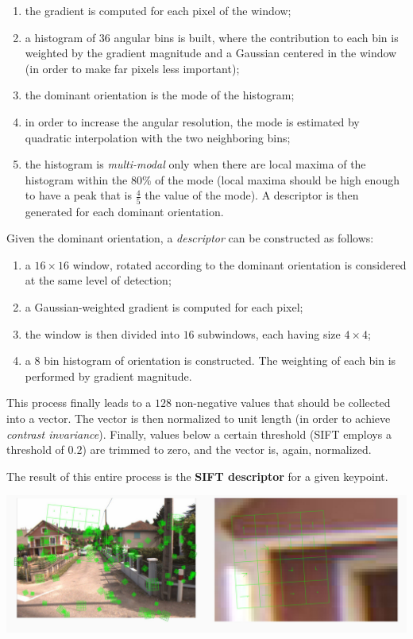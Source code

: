 \documentclass[10pt]{report}
\begin{document}
\begin{enumerate}
\item the gradient is computed for each pixel of the window;
\item a histogram of \(36\) angular bins is built, where the contribution
to each bin is weighted by the gradient magnitude and a Gaussian
centered in the window (in order to make far pixels less important);
\item the dominant orientation is the mode of the histogram;
\item in order to increase the angular resolution, the mode is estimated by
quadratic interpolation with the two neighboring bins;
\item the histogram is \emph{multi-modal} only when there are local maxima of
the histogram within the \(80\%\) of the mode (local maxima should be
high enough to have a peak that is \(\frac{4}{5}\) the value of the
mode). A descriptor is then generated for each dominant orientation.
\end{enumerate}

Given the dominant orientation, a \emph{descriptor} can be constructed as
follows:

\begin{enumerate}
\item a \(16 \times 16\) window, rotated according to the dominant
orientation is considered at the same level of detection;
\item a Gaussian-weighted gradient is computed for each pixel;
\item the window is then divided into \(16\) subwindows, each having size
\(4\times 4\);
\item a \(8\) bin histogram of orientation is constructed. The weighting of
each bin is performed by gradient magnitude.
\end{enumerate}

This process finally leads to a \(128\) non-negative values that should
be collected into a vector. The vector is then normalized to unit length
(in order to achieve \emph{contrast invariance}). Finally, values below a
certain threshold (SIFT employs a threshold of \(0.2\)) are trimmed to
zero, and the vector is, again, normalized.

The result of this entire process is the \textbf{SIFT descriptor} for a given
keypoint.

\begin{center}
\includegraphics[width=.9\linewidth]{./pics/det/sift-keypoints.jpg}
\end{center}
\end{document}
